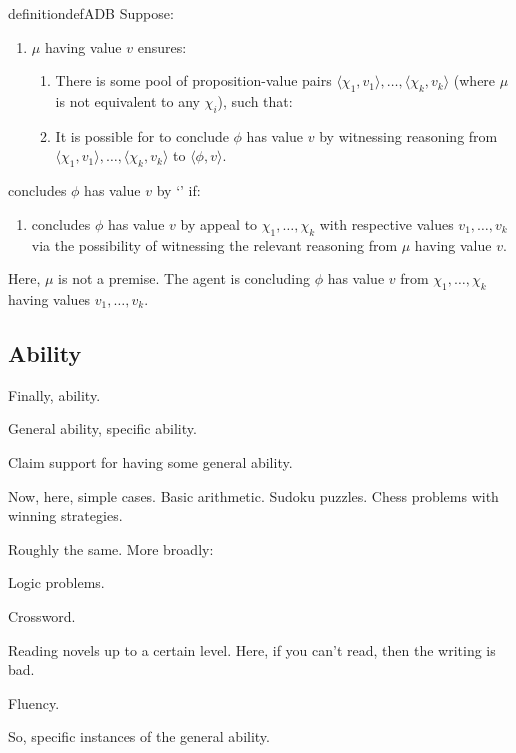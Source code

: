 \begin{note}
  \begin{restatable}[\adB{}]{definition}{defADB}
    \label{AR:adB}
    \label{def:adB}
    Suppose:
    \begin{enumerate}[label=\textsf{I:\arabic*}., ref=(\textsf{I}:\arabic*), series=adB_counter]
    \item
      \label{def:adB:poss}
      \(\mu\) having value \(v\) ensures:
      \begin{enumerate}
      \item
        There is some pool of proposition-value pairs \(\langle \chi_{1},v_{1} \rangle,\dots,\langle \chi_{k},v_{k} \rangle\) (where \(\mu\) is not equivalent to any \(\chi_{i}\)), such that:
      \item
        It is possible for \vAgent{} to conclude \(\phi\) has value \(v\) by witnessing reasoning from \(\langle \chi_{1},v_{1} \rangle,\dots,\langle \chi_{k},v_{k} \rangle\) to \(\langle \phi,v \rangle\).
      \end{enumerate}
    \end{enumerate}
    \vAgent{} concludes \(\phi\) has value \(v\) by `\adB{}' if:
    \begin{enumerate}[label=\textsf{I}:\arabic*., ref=(\textsf{I}:\arabic*), resume*=adB_counter]
    \item
      \label{def:adB:inter}
      \vAgent{} concludes \(\phi\) has value \(v\) by appeal to \(\chi_{1},\dots,\chi_{k}\) with respective values \(v_{1},\dots,v_{k}\) via the possibility of witnessing the relevant reasoning from \(\mu\) having value \(v\).
    \end{enumerate}
    \vspace{-\baselineskip}
  \end{restatable}

  Here, \(\mu\) is not a premise.
  The agent is concluding \(\phi\) has value \(v\) from \(\chi_{1},\dots,\chi_{k}\) having values \(v_{1},\dots,v_{k}\).
\end{note}


\subsection{Ability}
\label{sec:ability}

\begin{note}
  Finally, ability.

  General ability, specific ability.

  Claim support for having some general ability.

  Now, here, simple cases.
  Basic arithmetic.
  Sudoku puzzles.
  Chess problems with winning strategies.

  Roughly the same.
  More broadly:

  Logic problems.

  Crossword.

  Reading novels up to a certain level.
  Here, if you can't read, then the writing is bad.

  Fluency.

  So, specific instances of the general ability.
\end{note}

